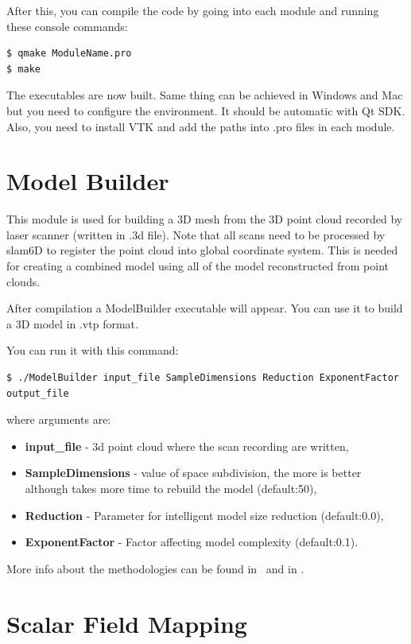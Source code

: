 \documentclass[11pt]{article} %
\begin{document}
After this, you can compile the code by going into each module and running these console commands:

\begin{verbatim}
$ qmake ModuleName.pro
$ make
\end{verbatim}

The executables are now built. Same thing can be achieved in Windows and Mac but you need to configure the environment. It should be automatic with Qt SDK. Also, you need to install VTK and add the paths into .pro  files in each module.

\section{Model Builder}

This module is used for building a 3D mesh from the 3D point cloud recorded by laser scanner (written in .3d file). Note that all scans need to be processed by slam6D to register the point cloud into global coordinate system. This is needed for creating a combined model using all of the model reconstructed from point clouds.

After compilation a ModelBuilder executable will appear. You can use it to build a 3D model in .vtp format.

You can run it with this command:

\begin{verbatim}
$ ./ModelBuilder input_file SampleDimensions Reduction ExponentFactor output_file
\end{verbatim}

where arguments are:
\begin{itemize}

\item \textbf{input\_file} - 3d point cloud where the scan recording are written,
\item \textbf{SampleDimensions} - value of space subdivision, the more is better although takes more time to rebuild the model (default:50),
\item \textbf{Reduction} - Parameter for intelligent model size reduction (default:0.0),
\item \textbf{ExponentFactor} - Factor affecting model complexity (default:0.1).
\end{itemize}

More info about the methodologies can be found in~\citep{osmankovicreconstructing} and in \citep{borrmannproject}.

\section{Scalar Field Mapping}
\end{document}
